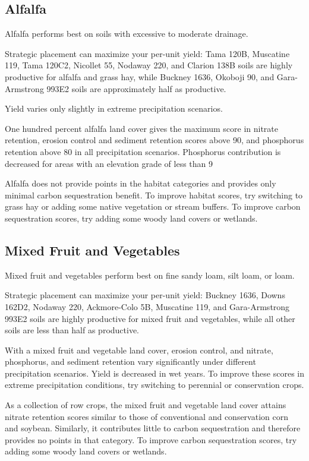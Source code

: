 \documentclass[11pt]{article}
\begin{document}
\subsection{Alfalfa}

Alfalfa performs best on soils with excessive to moderate drainage.

Strategic placement can maximize your per-unit yield: Tama 120B, Muscatine 119, Tama 120C2, Nicollet 55, Nodaway 220, and Clarion 138B soils are highly productive for alfalfa and grass hay, while Buckney 1636, Okoboji 90, and Gara-Armstrong 993E2 soils are approximately half as productive.

Yield varies only slightly in extreme precipitation scenarios.

One hundred percent alfalfa land cover gives the maximum score in nitrate retention, erosion control and sediment retention scores above 90, and phosphorus retention above 80 in all precipitation scenarios. Phosphorus contribution is decreased for areas with an elevation grade of less than 9%

Alfalfa does not provide points in the habitat categories and provides only minimal carbon sequestration benefit. To improve habitat scores, try switching to grass hay or adding some native vegetation or stream buffers. To improve carbon sequestration scores, try adding some woody land covers or wetlands.

\subsection{Mixed Fruit and Vegetables}

Mixed fruit and vegetables perform best on fine sandy loam, silt loam, or loam.

Strategic placement can maximize your per-unit yield: Buckney 1636, Downs 162D2, Nodaway 220, Ackmore-Colo 5B, Muscatine 119, and Gara-Armstrong 993E2 soils are highly productive for mixed fruit and vegetables, while all other soils are less than half as productive.

With a mixed fruit and vegetable land cover, erosion control, and nitrate, phosphorus, and sediment retention vary significantly under different precipitation scenarios. Yield is decreased in wet years. To improve these scores in extreme precipitation conditions, try switching to perennial or conservation crops.

As a collection of row crops, the mixed fruit and vegetable land cover attains nitrate retention scores similar to those of conventional and conservation corn and soybean. Similarly, it contributes little to carbon sequestration and therefore provides no points in that category. To improve carbon sequestration scores, try adding some woody land covers or wetlands.
\end{document}
